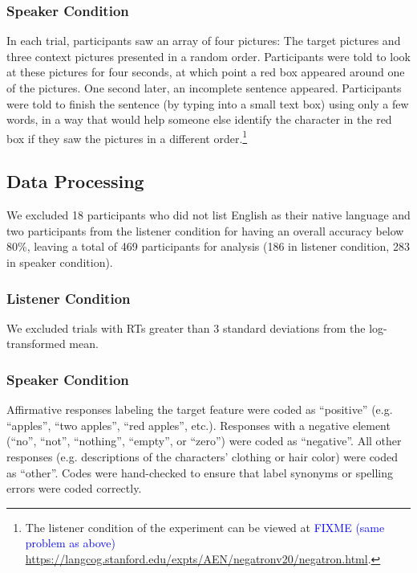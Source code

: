 \documentclass[man, noapacite]{apa2}
\begin{document}
\subsubsection{Speaker Condition}

In each trial, participants saw an array of four pictures: The target pictures and three context pictures presented in a random order.  Participants were told to look at these pictures for four seconds, at which point a red box appeared around one of the pictures.  One second later, an incomplete sentence appeared.  Participants were told to finish the sentence (by typing into a small text box) using only a few words, in a way that would help someone else identify the character in the red box if they saw the pictures in a different order.\footnote{The listener condition of the experiment can be viewed at 
\textcolor{blue}{FIXME (same problem as above)} \url{https://langcog.stanford.edu/expts/AEN/negatronv20/negatron.html}.}
  

 
 \subsection{Data Processing} 
  
We excluded 18 participants who did not list English as their native language and two participants from the listener condition for having an overall accuracy below 80\%, leaving a total of 469 participants for analysis (186 in listener condition, 283 in speaker condition). 

\subsubsection{Listener Condition}
We excluded trials with RTs greater than 3 standard deviations from the log-transformed mean.  

\subsubsection{Speaker Condition}
Affirmative responses labeling the target feature were coded as ``positive'' (e.g. ``apples'', ``two apples'', ``red apples'', etc.).  Responses with a negative element (``no'', ``not'', ``nothing'', ``empty'', or ``zero'') were coded as ``negative''.  All other responses (e.g. descriptions of the characters' clothing or hair color) were coded as ``other''.  Codes were hand-checked to ensure that label synonyms or spelling errors were coded correctly.  
\end{document}
